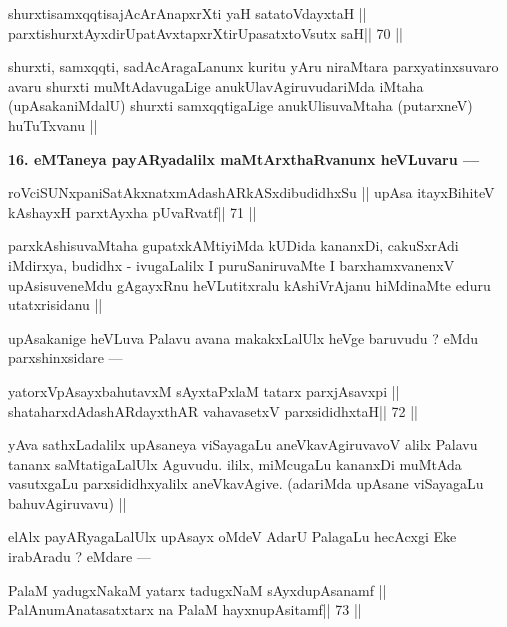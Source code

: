 \begin{shl}
shurxtisamxqqtisajAcArAnapxrXti yaH satatoVdayxtaH ||
parxtishurxtAyxdirUpatAvxtapxrXtirUpasatxtoV\s sutx saH\hfill || 70 ||
\end{shl}

\begin{artha}
shurxti, samxqqti, sadAcAragaLanunx kuritu yAru niraMtara parxyatinxsuvaro avaru shurxti muMtAdavugaLige anukUlavAgiruvudariMda iMtaha (upAsakaniMdalU) shurxti samxqqtigaLige anukUlisuvaMtaha (putarxneV) huTuTxvanu ||
\end{artha}

\begin{artha}
{\bf 16. eMTaneya payARyadalilx maMtArxthaRvanunx heVLuvaru ---}
\end{artha}

\begin{shl}
roVciSUNxpaniSatAkxnatxmAdashARkASxdibudidhxSu ||
upAsa itayxBihiteV kAshayxH parxtAyxha pUvaRvatf\hfill || 71 ||
\end{shl}

\begin{artha}
parxkAshisuvaMtaha gupatxkAMtiyiMda kUDida kananxDi, cakuSxrAdi 
iMdirxya, budidhx - ivugaLalilx I puruSaniruvaMte I barxhamxvanenxV upAsisuveneMdu gAgayxRnu heVLutitxralu kAshiVrAjanu hiMdinaMte eduru utatxrisidanu ||
\end{artha}

\begin{artha}
upAsakanige heVLuva Palavu avana makakxLalUlx heVge baruvudu ? eMdu parxshinxsidare ---
\end{artha}

\begin{shl}
yatorxVpAsayxbahutavxM sAyxtaPxlaM tatarx parxjAsavxpi ||
shataharxdAdashARdayxthAR vahavasetxV parxsididhxtaH\hfill || 72 ||
\end{shl}

\begin{artha}
yAva sathxLadalilx upAsaneya viSayagaLu aneVkavAgiruvavoV alilx Palavu tananx saMtatigaLalUlx Aguvudu. ililx, miMcugaLu kananxDi muMtAda vasutxgaLu parxsididhxyalilx aneVkavAgive. (adariMda upAsane viSayagaLu bahuvAgiruvavu) ||
\end{artha} 
 
\begin{artha}
elAlx payARyagaLalUlx upAsayx oMdeV AdarU PalagaLu hecAcxgi Eke irabAradu ? eMdare ---
\end{artha}

\begin{shl}
PalaM yadugxNakaM yatarx tadugxNaM sAyxdupAsanamf ||
PalAnumAnatasatxtarx na PalaM hayxnupAsitamf\hfill || 73 ||
\end{shl}

